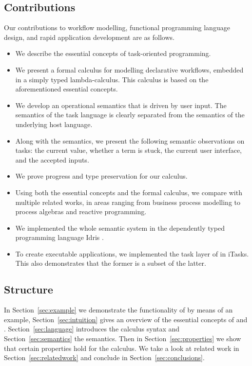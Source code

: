 \subsection{Contributions}

Our contributions to workflow modelling, functional programming language design, and rapid application development are as follows.


\begin{itemize}
  \item
    We describe the essential concepts of task-oriented programming.

  \item
    We present a formal calculus for modelling declarative workflows, embedded in a simply typed lambda-calculus.
    This calculus is based on the aforementioned essential \TOP concepts.

  \item
    We develop an operational semantics that is driven by user input.
    The semantics of the task language is clearly separated from the semantics of the underlying host language.

  \item
    Along with the semantics, we present the following semantic observations on tasks:
    the current value, whether a term is stuck, the current user interface, and the accepted inputs. 

  \item
    We prove progress and type preservation for our calculus.

  \item
    Using both the essential concepts and the formal calculus, we compare \TOP with multiple related works, in areas ranging from business process modelling to process algebras and reactive programming.

  \item
    We implemented the whole semantic system in the dependently typed programming language Idris \cite{journals/jfp/Brady13}.

  \item

    To create executable applications, we implemented the task layer of \TOPHAT in iTasks.
    This also demonstrates that the former is a subset of the latter.


\end{itemize}


\subsection{Structure}

In Section~\ref{sec:example} we demonstrate the functionality of \TOPHAT by means of an example,
Section~\ref{sec:intuition} gives an overview of the essential concepts of \TOP and \TOPHAT.
Section~\ref{sec:language} introduces the \TOPHAT calculus syntax
and Section~\ref{sec:semantics} the semantics.
Then in Section~\ref{sec:properties} we show that certain properties hold for the calculus.
We take a look at related work in Section~\ref{sec:relatedwork}
and conclude in Section~\ref{sec:conclusions}.
